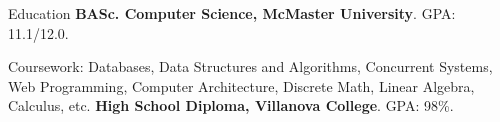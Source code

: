 \begin{rubric}{Education}
	\entry*[2022 -- 2026]%
	\textbf{BASc. Computer Science, McMaster University}. GPA: 11.1/12.0.
	\par Coursework: Databases, Data Structures and Algorithms, Concurrent Systems,
	Web Programming, Computer Architecture, Discrete Math, Linear Algebra, Calculus, etc.
	\entry*[2018 -- 2022]%
	\textbf{High School Diploma, Villanova College}. GPA: 98\%.
\end{rubric}
